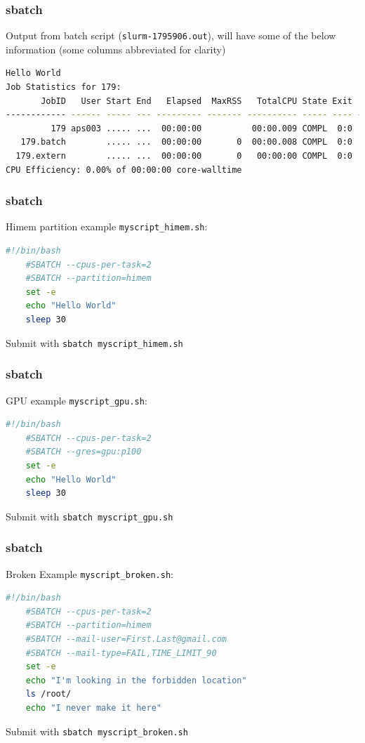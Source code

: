 \documentclass{beamer}
\newcommand{\code}[1]{\colorbox{codegray}{\texttt{#1}}}
\begin{document}
\begin{frame}[fragile]
\frametitle{sbatch}
Output from batch script (\code{slurm-1795906.out}), will have some of the below information (some columns abbreviated for clarity)
\begingroup
\tiny
\begin{lstlisting}[backgroundcolor = \color{codegray}, language = Bash]
Hello World
Job Statistics for 179:
       JobID   User Start End   Elapsed  MaxRSS   TotalCPU State Exit  NodeList ReqTRES
------------ ------ ----- --- --------- ------- ---------- ----- ---- --------- ----------------
         179 aps003 ..... ...  00:00:00          00:00.009 COMPL  0:0    node01  cpu=1,mem=6144M
   179.batch        ..... ...  00:00:00       0  00:00.008 COMPL  0:0    node01
  179.extern        ..... ...  00:00:00       0   00:00:00 COMPL  0:0    node01
CPU Efficiency: 0.00% of 00:00:00 core-walltime
\end{lstlisting}
\endgroup
\end{frame}


\begin{frame}[fragile]
\frametitle{sbatch}
Himem partition example \code{myscript\_himem.sh}: 
\begin{lstlisting}[backgroundcolor = \color{codegray}, language = Bash]
    #!/bin/bash
    #SBATCH --cpus-per-task=2
    #SBATCH --partition=himem
    set -e
    echo "Hello World"
    sleep 30
\end{lstlisting}
\bigskip
\bigskip
Submit with \code{sbatch myscript\_himem.sh}
\end{frame}


\begin{frame}[fragile]
\frametitle{sbatch}
GPU example \code{myscript\_gpu.sh}: 
\begin{lstlisting}[backgroundcolor = \color{codegray}, language = Bash]
    #!/bin/bash
    #SBATCH --cpus-per-task=2
    #SBATCH --gres=gpu:p100
    set -e
    echo "Hello World"
    sleep 30
\end{lstlisting}
\bigskip
\bigskip
Submit with \code{sbatch myscript\_gpu.sh}
\end{frame}



\begin{frame}[fragile]
\frametitle{sbatch}
Broken Example \code{myscript\_broken.sh}: 
\begin{lstlisting}[backgroundcolor = \color{codegray}, language = Bash]
    #!/bin/bash
    #SBATCH --cpus-per-task=2
    #SBATCH --partition=himem
    #SBATCH --mail-user=First.Last@gmail.com
    #SBATCH --mail-type=FAIL,TIME_LIMIT_90
    set -e
    echo "I'm looking in the forbidden location"
    ls /root/
    echo "I never make it here"
\end{lstlisting}
\bigskip
\bigskip
Submit with \code{sbatch myscript\_broken.sh}
\end{frame}
\end{document}
